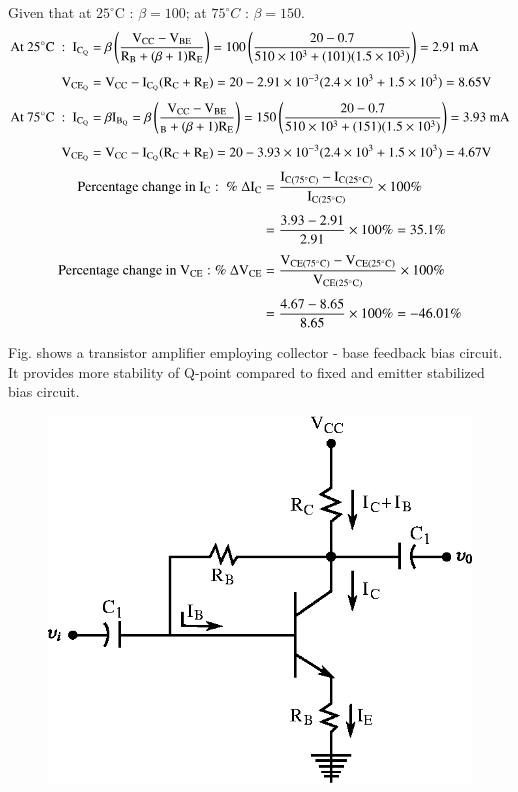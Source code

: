 \begin{solution}
Given that at $25^{\circ}$C : $\beta=100$; at $75^{\circ}C$ : $\beta=150$.
\begin{align*}
\text{At~}25^{\circ}\textrm{C}~ :~ \textrm{I}_{\textrm{C}_{\textrm{Q}}} &=\beta\left(\frac{\textrm{V}_{\text{CC}}-\textrm{V}_{\text{BE}}}{\textrm{R}_{\textrm{B}}+(\beta+1)\textrm{R}_{\textrm{E}}}\right)=100\left(\frac{20-0.7}{510\times 10^{3}+(101)(1.5\times 10^{3})}\right)=2.91\text{~mA}\\[4pt]
\textrm{V}_{\text{CE}_{\textrm{Q}}} &= \textrm{V}_{\text{CC}}-\textrm{I}_{\textrm{C}_{\textrm{Q}}}(\textrm{R}_{\textrm{C}}+\textrm{R}_{\textrm{E}})=20-2.91\times 10^{-3}(2.4\times 10^{3}+1.5\times 10^{3})=8.65\textrm{V}\\[4pt]
\text{At~} 75^{\circ}\textrm{C}~ :~ \textrm{I}_{\textrm{C}_{\textrm{Q}}} &= \beta \textrm{I}_{\textrm{B}_{\textrm{Q}}}=\beta \left(\frac{\textrm{V}_{\text{CC}}-\textrm{V}_{\text{BE}}}{\rm_{\textrm{B}}+(\beta+1)\textrm{R}_{\textrm{E}}}\right)=150 \left(\frac{20-0.7}{510\times 10^{3}+(151)(1.5\times 10^{3})}\right)=3.93\text{~mA}\\[4pt]
\textrm{V}_{\text{CE}_{\textrm{Q}}} &= \textrm{V}_{\text{CC}}-\textrm{I}_{\textrm{C}_{\textrm{Q}}}(\textrm{R}_{\textrm{C}}+\textrm{R}_{\textrm{E}})=20-3.93\times 10^{-3}(2.4\times 10^{3}+1.5\times 10^{3})=4.67\textrm{V}
\end{align*}
\begin{align*}
\text{Percentage change in~} \textrm{I}_{\textrm{C}} : \ \%\ \Delta \textrm{I}_{\textrm{C}} &= \frac{\textrm{I}_{\textrm{C}(75^{\circ}\textrm{C})}-\textrm{I}_{\textrm{C}(25^{\circ}\textrm{C})}}{\textrm{I}_{\textrm{C}(25^{\circ}\textrm{C})}}\times 100\%\\[4pt]
&= \frac{3.93-2.91}{2.91}\times 100\% = 35.1\%\\[4pt]
\text{Percentage change in~} \textrm{V}_{\text{CE}} : \%\ \Delta \textrm{V}_{\text{CE}} &= \frac{\textrm{V}_{\text{CE}(75^{\circ}\textrm{C})}-\textrm{V}_{\text{CE}(25^{\circ}\textrm{C})}}{\textrm{V}_{\text{CE}(25^{\circ}\textrm{C})}}\times 100\%\\[4pt]
&= \frac{4.67-8.65}{8.65}\times 100\% = -46.01\%
\end{align*}

Fig. shows a transistor amplifier employing collector - base feedback bias circuit. It provides more stability of Q-point compared to fixed and emitter stabilized bias circuit.
\begin{figure}[H]
\centering
\includegraphics{chap3/fig3.14.eps}
\end{figure}


\end{solution}
